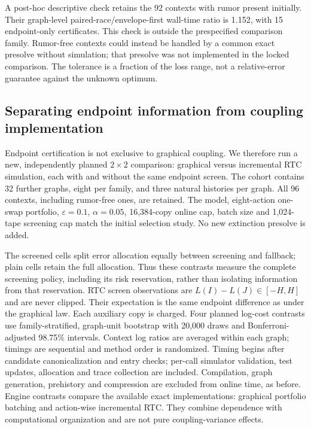 \documentclass[preprint,11pt,sort&compress]{elsarticle}
\begin{document}
A post-hoc descriptive check retains the 92 contexts with rumor present initially. Their graph-level paired-race/envelope-first wall-time ratio is 1.152, with 15 endpoint-only certificates. This check is outside the prespecified comparison family. Rumor-free contexts could instead be handled by a common exact presolve without simulation; that presolve was not implemented in the locked comparison. The tolerance is a fraction of the loss range, not a relative-error guarantee against the unknown optimum.


\subsection{Separating endpoint information from coupling implementation}
\label{sec:factorial}
Endpoint certification is not exclusive to graphical coupling. We therefore
run a new, independently planned $2\times2$ comparison: graphical versus
incremental RTC simulation, each with and without the same endpoint screen.
The cohort contains 32 further graphs, eight per family, and three natural
histories per graph. All 96 contexts, including rumor-free ones, are retained.
The model, eight-action one-swap portfolio, $\varepsilon=0.1$, $\alpha=0.05$,
16,384-copy online cap, batch size and 1,024-tape screening cap match the
initial selection study. No new extinction presolve is added.

The screened cells split error allocation equally between screening and
fallback; plain cells retain the full allocation. Thus these contrasts
measure the complete screening policy, including its risk reservation,
rather than isolating information from that reservation. RTC screen
observations are $L(I)-L(J)\in[-H,H]$ and are never clipped. Their expectation
is the same endpoint difference as under the graphical law. Each auxiliary
copy is charged. Four planned log-cost contrasts use family-stratified,
graph-unit bootstrap with 20,000 draws and Bonferroni-adjusted 98.75\%
intervals. Context log ratios are averaged within each graph; timings are
sequential and method order is randomized. Timing begins after candidate
canonicalization and entry checks; per-call simulator validation, test
updates, allocation and trace collection are included. Compilation, graph generation,
prehistory and compression are excluded from online time, as before.
Engine contrasts compare the available exact implementations: graphical
portfolio batching and action-wise incremental RTC. They combine
dependence with computational organization and are not pure
coupling-variance effects.
\end{document}
